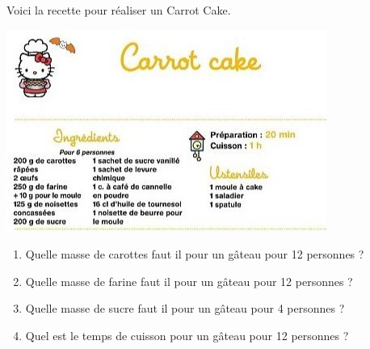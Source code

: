 
Voici la recette pour réaliser un Carrot Cake.

\begin{center}
\includegraphics[scale=1]{Prop-7.jpg} 
\end{center}

\begin{enumerate}
\item Quelle masse de carottes faut il pour un gâteau pour 12 personnes ?
\item Quelle masse de farine faut il pour un gâteau pour 12 personnes ?
\item Quelle masse de sucre faut il pour un gâteau pour 4 personnes ?
\item Quel est le temps de cuisson pour un gâteau pour 12 personnes ?
\end{enumerate}
